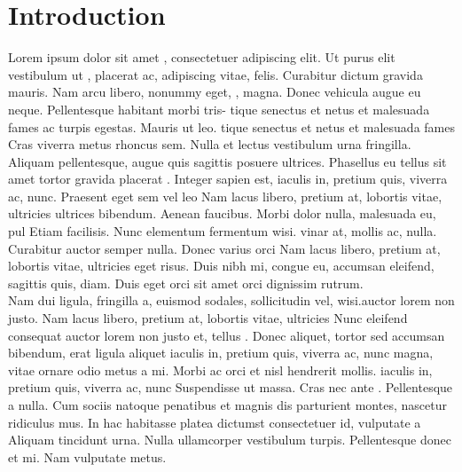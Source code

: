 \documentclass[11pt,a4paper]{article}
\begin{document}
\section{Introduction}

Lorem ipsum dolor sit amet \cite{Phys.Rev.Lett.109.160401} , consectetuer adipiscing elit. Ut purus elit 
vestibulum ut \cite{Ellis:2013yxa}, placerat ac, adipiscing vitae, felis. Curabitur dictum gravida
mauris. Nam arcu libero, nonummy eget, \cite{Phys.Lett.B829(2022)137105, Brod:2013cka,Ellis:2013yxa,Boudjema:2015nda},
magna. Donec \cite{ProbablyWeinberg} vehicula augue eu neque. Pellentesque habitant morbi tris-
tique senectus et netus et malesuada fames ac turpis egestas. Mauris ut leo. tique senectus et netus et malesuada fames 
Cras viverra metus rhoncus sem. Nulla et lectus vestibulum urna fringilla.  Aliquam pellentesque, augue quis sagittis posuere
ultrices. Phasellus eu tellus sit amet tortor gravida placerat \cite{Khachatryan:2016vau,Bhattacharyya:2012tj}. Integer sapien
est, iaculis in, pretium quis, viverra ac, nunc. Praesent eget sem vel leo Nam lacus libero, pretium at, lobortis vitae, ultricies
ultrices bibendum. Aenean faucibus. Morbi dolor nulla, malesuada eu, pul Etiam facilisis. Nunc elementum fermentum wisi. 
vinar at, mollis ac, nulla. Curabitur auctor semper nulla. Donec varius orci Nam lacus libero, pretium at, lobortis vitae, ultricies
eget risus. \cite{hep-ph/9605326,BhupalDev:2007ftb} Duis nibh mi, congue eu, accumsan eleifend, sagittis quis, diam.
Duis eget orci sit amet orci dignissim rutrum.\\

Nam dui ligula, fringilla a, euismod sodales, \cite{(inprep)(Faroughy;Darius)(Camargo-Molina;Eliel), Fajfer:2012si}  sollicitudin vel, wisi.auctor lorem non justo. Nam lacus libero, pretium at, lobortis vitae, ultricies Nunc eleifend consequat auctor lorem non justo
et, tellus \cite{SovietGuy}. Donec aliquet, tortor sed accumsan bibendum, erat ligula aliquet iaculis in, pretium quis, viverra ac, nunc
magna, vitae ornare odio metus a mi. Morbi ac orci et nisl hendrerit mollis.  iaculis in, pretium quis, viverra ac, nunc
Suspendisse ut massa. Cras nec ante \cite{SciPostPhys.7(2019)014,Comput.Phys.Commun.276(2022)108330}. Pellentesque a nulla. Cum sociis
natoque penatibus et magnis dis parturient montes, nascetur ridiculus mus.  In hac habitasse platea dictumst consectetuer id, vulputate a
Aliquam tincidunt urna. Nulla ullamcorper vestibulum turpis. Pellentesque donec et mi. Nam vulputate metus.  
\end{document}
